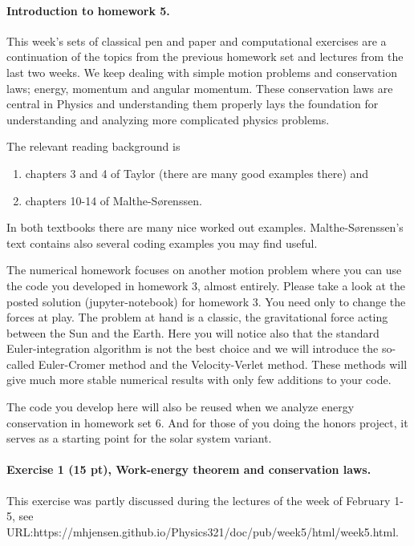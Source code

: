 \documentclass[%
oneside,                 %
final,                   %
10pt]{article}
\begin{document}
\noindent
\paragraph{Introduction to homework 5.}
This week's sets of classical pen and paper and computational
exercises are a continuation of the topics from the previous homework
set and lectures from the last two weeks. We keep dealing with simple motion problems and conservation
laws; energy, momentum and angular momentum. These conservation laws
are central in Physics and understanding them properly lays the
foundation for understanding and analyzing more complicated physics
problems.

The relevant reading background is
\begin{enumerate}
\item chapters 3 and 4 of Taylor (there are many good examples there) and

\item chapters 10-14 of Malthe-Sørenssen.
\end{enumerate}

\noindent
In both textbooks there are many nice worked out examples. Malthe-Sørenssen's text contains also several coding examples you may find useful. 


The numerical homework focuses on another motion problem where you can
use the code you developed in homework 3, almost entirely. Please take
a look at the posted solution (jupyter-notebook) for homework 3. You
need only to change the forces at play. The problem at hand is a
classic, the gravitational force acting between the Sun and the
Earth. Here you will notice also that the standard Euler-integration
algorithm is not the best choice and we will introduce the so-called
Euler-Cromer method and the Velocity-Verlet method. These methods will
give much more stable numerical results with only few additions to
your code.

The code you develop here will also be reused when we analyze energy
conservation in homework set 6. And for those of you doing the honors
project, it serves as a starting point for the solar system variant.


\paragraph{Exercise 1 (15 pt), Work-energy theorem and conservation laws.}
This exercise was partly discussed during the lectures of the week of February 1-5, see URL:https://mhjensen.github.io/Physics321/doc/pub/week5/html/week5.html.
\end{document}
